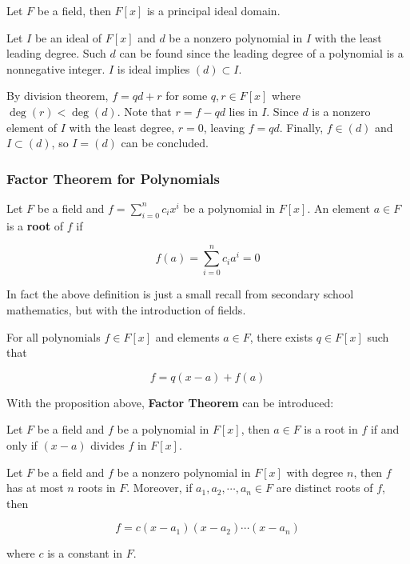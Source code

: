 \documentclass[a4paper,12pt]{article}
\begin{document}
\begin{thm}
  Let $F$ be a field, then $F[x]$ is a principal ideal domain.\n

  \prf Let $I$ be an ideal of $F[x]$ and $d$ be a nonzero polynomial in $I$ with the least leading degree. Such $d$ can be found since the leading degree of a polynomial is a nonnegative integer. $I$ is ideal implies $(d)\subset I$.\n

  By division theorem, $f=qd+r$ for some $q,r\in F[x]$ where $\deg(r)<\deg(d)$. Note that $r=f-qd$ lies in $I$. Since $d$ is a nonzero element of $I$ with the least degree, $r=0$, leaving $f=qd$. Finally, $f\in(d)$ and $I\subset(d)$, so $I=(d)$ can be concluded.
\end{thm}

\subsubsection{Factor Theorem for Polynomials}
\begin{dft}
  Let $F$ be a field and $f=\sum_{i=0}^{n}c_{i}x^{i}$ be a polynomial in $F[x]$. An element $a\in F$ is a \textbf{root} of $f$ if

  $$f(a)=\sum_{i=0}^{n}c_{i}a^{i}=0$$
\end{dft}\n

In fact the above definition is just a small recall from secondary school mathematics, but with the introduction of fields.\n

\begin{pst}
  For all polynomials $f\in F[x]$ and elements $a\in F$, there exists $q\in F[x]$ such that

  $$f=q(x-a)+f(a)$$
\end{pst}\n

With the proposition above, \textbf{Factor Theorem} can be introduced:\n

\begin{thm}
  Let $F$ be a field and $f$ be a polynomial in $F[x]$, then $a\in F$ is a root in $f$ if and only if $(x-a)$ divides $f$ in $F[x]$.
\end{thm}\n

\begin{thm}
  Let $F$ be a field and $f$ be a nonzero polynomial in $F[x]$ with degree $n$, then $f$ has at most $n$ roots in $F$. Moreover, if $a_{1},a_{2},\cdots,a_{n}\in F$ are distinct roots of $f$, then

  $$f=c(x-a_{1})(x-a_{2})\cdots(x-a_{n})$$\s

  where $c$ is a constant in $F$.
\end{thm}\n
\end{document}
